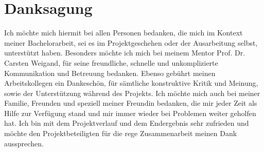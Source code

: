 \section*{Danksagung}
Ich möchte mich hiermit bei allen Personen bedanken, die mich im Kontext meiner Bachelorarbeit, sei es im Projektgeschehen oder der Ausarbeitung selbst, unterstützt haben. Besonders möchte ich mich bei meinem Mentor Prof. Dr. Carsten Weigand, für seine freundliche, schnelle und unkomplizierte Kommunikation und Betreuung bedanken. Ebenso gebührt meinen Arbeitskollegen ein Dankeschön, für sämtliche konstruktive Kritik und Meinung, sowie der Unterstützung während des Projekts. Ich möchte mich auch bei meiner Familie, Freunden und speziell meiner Freundin bedanken, die mir jeder Zeit als Hilfe zur Verfügung stand und mir immer wieder bei Problemen weiter geholfen hat. Ich bin mit dem Projektverlauf und dem Endergebnis sehr zufrieden und möchte den Projektbeteiligten für die rege Zusammenarbeit meinen Dank aussprechen.